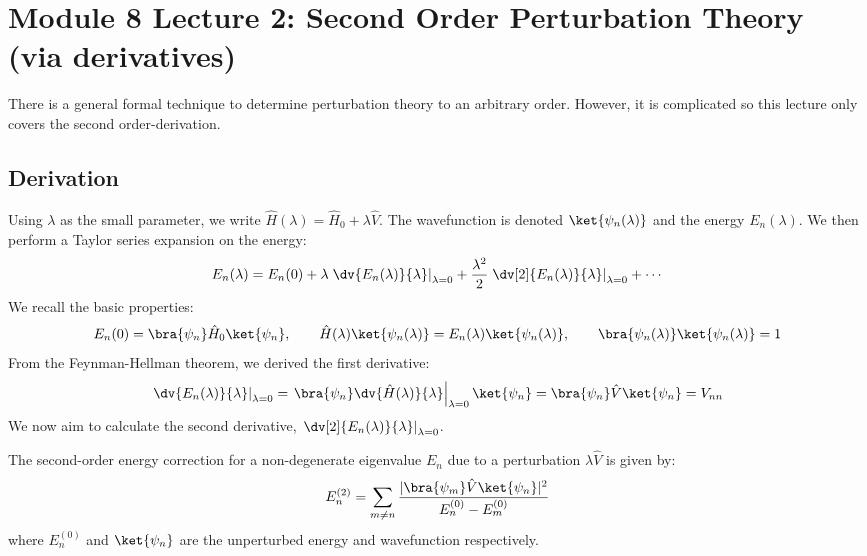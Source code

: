 \hr
\section{Module 8 Lecture 2: Second Order Perturbation Theory (via derivatives)}
There is a general formal technique to determine perturbation theory
to an arbitrary order. However, it is complicated so this lecture
only covers the second order-derivation.

\subsection{Derivation}
Using $\lambda$ as the small parameter, we write $\hat H(\lambda) =
\hat H_0 + \lambda \hat V$. The wavefunction is denoted
$\ket{\psi_n(\lambda)}$ and the energy $E_n(\lambda)$. We then
perform a Taylor series expansion on the energy:
\begin{equation} \label{eq:energy_taylor_expansion}
  E_n(\lambda) = E_n(0) + \lambda
  \left.\dv{E_n(\lambda)}{\lambda}\right|_{\lambda=0} +
  \frac{\lambda^2}{2}
  \left.\dv[2]{E_n(\lambda)}{\lambda}\right|_{\lambda=0} + \cdots
\end{equation}
We recall the basic properties:
\begin{equation} \label{eq:schrodinger_normalization_perturbed}
  E_n(0) = \bra{\psi_n} \hat H_0 \ket{\psi_n}, \quad\quad \hat
  H(\lambda)\ket{\psi_n(\lambda)} =
  E_n(\lambda)\ket{\psi_n(\lambda)}, \quad\quad
  \bra{\psi_n(\lambda)} \ket{\psi_n(\lambda)} = 1
\end{equation}
From the Feynman-Hellman theorem, we derived the first derivative:
\begin{equation} \label{eq:first_derivative_perturbation}
  \left.\dv{E_n(\lambda)}{\lambda}\right|_{\lambda=0} =
  \left.\bra{\psi_n}\dv{\hat
  H(\lambda)}{\lambda}\right|_{\lambda=0}\ket{\psi_n} =
  \bra{\psi_n}\hat V\ket{\psi_n} = V_{nn}
\end{equation}
We now aim to calculate the second derivative,
$\left.\dv[2]{E_n(\lambda)}{\lambda}\right|_{\lambda=0}$.

\begin{theorem}
  The second-order energy correction for a non-degenerate
  eigenvalue $E_n$ due to a perturbation $\lambda \hat V$ is given by:
  \begin{equation} \label{eq:second_order_energy_correction}
    E_n^{(2)} = \sum_{m \ne n} \frac{|\bra{\psi_m}\hat
    V\ket{\psi_n}|^2}{E_n^{(0)} - E_m^{(0)}}
  \end{equation}
  where $E_n^{(0)}$ and $\ket{\psi_n}$ are the unperturbed energy
  and wavefunction respectively.
\end{theorem}

